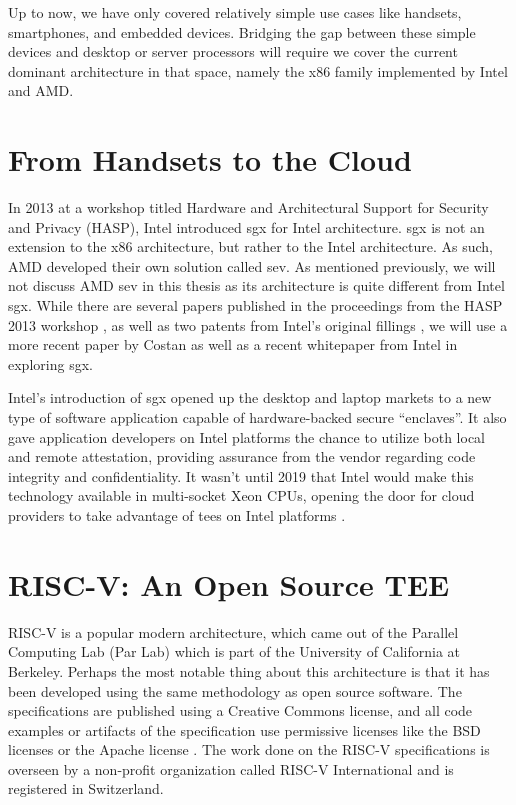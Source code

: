 Up to now, we have only covered relatively simple use cases like handsets, smartphones, and embedded devices. Bridging the gap between these simple devices and desktop or server processors will require we cover the current dominant architecture in that space, namely the x86 family implemented by Intel and AMD.

\section{From Handsets to the Cloud}
In 2013 at a workshop titled Hardware and Architectural Support for Security and Privacy (HASP), Intel introduced \gls{sgx} for Intel architecture. \gls{sgx} is not an extension to the x86 architecture, but rather to the Intel architecture. As such, AMD developed their own solution called \gls{sev}. As mentioned previously, we will not discuss AMD \gls{sev} in this thesis as its architecture is quite different from Intel \gls{sgx}. While there are several papers published in the proceedings from the HASP 2013 workshop \cite{10.1145/2487726.2488368, 10.1145/2487726.2488370, anati2013innovative}, as well as two patents from Intel's original fillings \cite{johnson2010technique, mckeen2009method}, we will use a more recent paper by Costan \cite{Costan2016} as well as a recent whitepaper from Intel \cite{johnson2016intel} in exploring \gls{sgx}.

Intel's introduction of \gls{sgx} opened up the desktop and laptop markets to a new type of software application capable of hardware-backed secure ``enclaves''. It also gave application developers on Intel platforms the chance to utilize both local and remote \gls{attestation}, providing assurance from the vendor regarding code integrity and confidentiality. It wasn't until 2019 that Intel would make this technology available in multi-socket Xeon CPUs, opening the door for cloud providers to take advantage of \glspl{tee} on Intel platforms \cite{10.1145/3337167.3337173}.

\section{RISC-V: An Open Source TEE}
RISC-V is a popular modern architecture, which came out of the Parallel Computing Lab (Par Lab) which is part of the University of California at Berkeley. Perhaps the most notable thing about this architecture is that it has been developed using the same methodology as open source software. The specifications are published using a Creative Commons license, and all code examples or artifacts of the specification use permissive licenses like the BSD licenses or the Apache license \cite{UnprivIsa2019}. The work done on the RISC-V specifications is overseen by a non-profit organization called RISC-V International and is registered in Switzerland.

